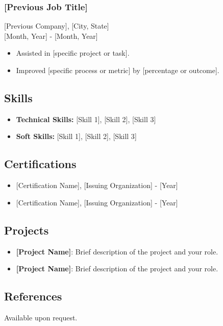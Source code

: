 \documentclass[11pt,a4paper]{article}
\providecommand{\tightlist}{%
  \setlength{\itemsep}{0pt}\setlength{\parskip}{0pt}}
\begin{document}
\subsubsection{{[}Previous Job Title{]}}\label{previous-job-title}

{[}Previous Company{]}, {[}City, State{]}\\
{[}Month, Year{]} - {[}Month, Year{]}

\begin{itemize}
\tightlist
\item
  Assisted in {[}specific project or task{]}.
\item
  Improved {[}specific process or metric{]} by {[}percentage or
  outcome{]}.
\end{itemize}

\subsection{Skills}\label{skills}

\begin{itemize}
\tightlist
\item
  \textbf{Technical Skills:} {[}Skill 1{]}, {[}Skill 2{]}, {[}Skill 3{]}
\item
  \textbf{Soft Skills:} {[}Skill 1{]}, {[}Skill 2{]}, {[}Skill 3{]}
\end{itemize}

\subsection{Certifications}\label{certifications}

\begin{itemize}
\tightlist
\item
  {[}Certification Name{]}, {[}Issuing Organization{]} - {[}Year{]}
\item
  {[}Certification Name{]}, {[}Issuing Organization{]} - {[}Year{]}
\end{itemize}

\subsection{Projects}\label{projects}

\begin{itemize}
\tightlist
\item
  \textbf{{[}Project Name{]}}: Brief description of the project and your
  role.
\item
  \textbf{{[}Project Name{]}}: Brief description of the project and your
  role.
\end{itemize}

\subsection{References}\label{references}

Available upon request.
\end{document}
